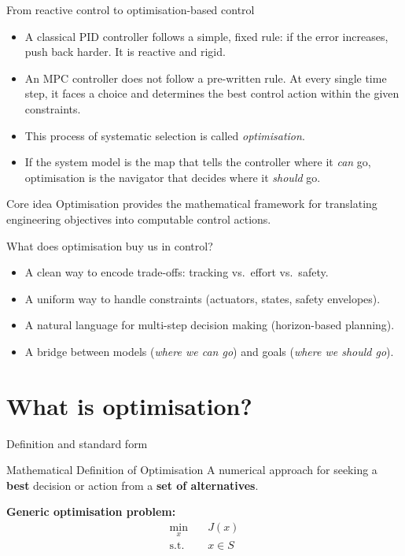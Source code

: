 \documentclass[aspectratio=169,10pt]{beamer}
\begin{document}
\begin{frame}{From reactive control to optimisation-based control}
\begin{itemize}
  \item A classical PID controller follows a simple, fixed rule: if the error increases, push back harder. It is reactive and rigid.
  \item An MPC controller does not follow a pre-written rule. At every single time step, it faces a choice and determines the best control action within the given constraints.
  \item This process of systematic selection is called \emph{optimisation}.
  \item If the system model is the map that tells the controller where it \textit{can} go, optimisation is the navigator that decides where it \textit{should} go.
\end{itemize}
\begin{defnbox}{Core idea}
Optimisation provides the mathematical framework for translating engineering objectives into computable control actions.
\end{defnbox}
\end{frame}

\begin{frame}{What does optimisation buy us in control?}
\begin{itemize}
  \item A clean way to encode trade-offs: tracking vs.\ effort vs.\ safety.
  \item A uniform way to handle constraints (actuators, states, safety envelopes).
  \item A natural language for multi-step decision making (horizon-based planning).
  \item A bridge between models (\emph{where we can go}) and goals (\emph{where we should go}).
\end{itemize}
\end{frame}

\section{What is optimisation?}

\begin{frame}{Definition and standard form}
\begin{defnbox}{Mathematical Definition of Optimisation}
A numerical approach for seeking a \textbf{best} decision or action from a \textbf{set of alternatives}.
\end{defnbox}

\vspace{0.4em}
\textbf{Generic optimisation problem:}
\begin{equation*}
\begin{aligned}
\min_{x}\quad &J(x)\\
\text{s.t.}\quad &x \in S
\end{aligned}
\end{equation*}
\end{frame}
\end{document}

